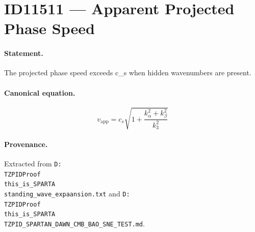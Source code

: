 \section*{ID11511 --- Apparent Projected Phase Speed}

\paragraph{Statement.}
The projected phase speed exceeds c_s when hidden wavenumbers are present.

\paragraph{Canonical equation.}
\[
v_{\mathrm{app}}=c_s\sqrt{1+\frac{k_\alpha^2+k_\beta^2}{k_3^2}}
\]

\paragraph{Provenance.}
Extracted from \texttt{D:\\TZPIDProof\\this\_is\_SPARTA\\standing\_wave\_expaansion.txt} and \texttt{D:\\TZPIDProof\\this\_is\_SPARTA\\TZPID\_SPARTAN\_DAWN\_CMB\_BAO\_SNE\_TEST.md}.
